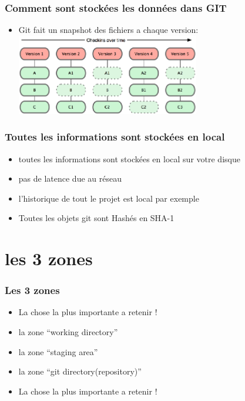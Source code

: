 \documentclass{beamer}
\begin{document}
   \begin{frame}
      \frametitle{Comment sont stockées les données dans GIT}
      \begin{itemize}
        \item Git fait un snapshot des fichiers a chaque version:
         \includegraphics[width=8cm]{imgs/snapshot.eps}
      \end{itemize}
    \end{frame}

   \begin{frame}
      \frametitle{Toutes les informations sont stockées en local}
      \begin{itemize}
        \item toutes les informations sont stockées en local sur votre disque
        \item pas de latence due au réseau
        \item l'historique de tout le projet est local par exemple
        \item Toutes les objets git sont Hashés en SHA-1
      \end{itemize}
    \end{frame}
   \section{les 3 zones}

   \begin{frame}
     \frametitle{Les 3 zones}
     \begin{itemize}
     \item \alert{La chose la plus importante a retenir !}
     \item la zone ``working directory''
     \item la zone ``staging area''
     \item la zone ``git directory(repository)''
     \item \alert{La chose la plus importante a retenir !}
     \end{itemize}
   \end{frame}
\end{document}
